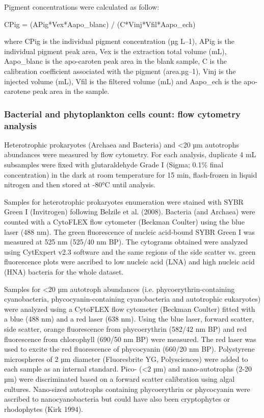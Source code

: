 \documentclass[essd, manuscript]{copernicus}
\begin{document}
Pigment concentrations were calculated as follow:


CPig = (APig*Vex*Aapo\_blanc) / (C*Vinj*Vfil*Aapo\_ech)
 
where CPig is the individual pigment concentration (µg L–1), APig is the individual pigment peak area, Vex is the extraction total volume (mL), Aapo\_blanc is the apo-caroten peak area in the blank sample, C is the calibration coefficient associated with the pigment (area.µg–1), Vinj is the injected volume (mL), Vfil is the filtered volume (mL) and Aapo\_ech is the apo-carotene peak area in the sample.


\subsubsection{Bacterial and phytoplankton cells count: flow cytometry analysis}
Heterotrophic prokaryotes (Archaea and Bacteria) and <20 µm autotrophs abundances were measured by flow cytometry. For each analysis, duplicate 4 mL subsamples were fixed with glutaraldehyde Grade I (Sigma; 0.1\% final concentration) in the dark at room temperature for 15 min, flash-frozen in liquid nitrogen and then stored at -80°C until analysis. 
 
Samples for heterotrophic prokaryotes enumeration were stained with SYBR Green I (Invitrogen) following Belzile et al. (2008). Bacteria (and Archaea) were counted with a CytoFLEX flow cytometer (Beckman Coulter) using the blue laser (488 nm). The green fluorescence of nucleic acid-bound SYBR Green I was measured at 525 nm (525/40 nm BP). The cytograms obtained were analyzed using CytExpert v2.3 software and the same regions of the side scatter vs. green fluorescence plots were ascribed to low nucleic acid (LNA) and high nucleic acid (HNA) bacteria for the whole dataset.
 
Samples for <20 µm autotroph abundances (i.e. phycoerythrin-containing cyanobacteria, phycocyanin-containing cyanobacteria and autotrophic eukaryotes) were analyzed using a CytoFLEX flow cytometer (Beckman Coulter) fitted with a blue (488 nm) and a red laser (638 nm). Using the blue laser, forward scatter, side scatter, orange fluorescence from phycoerythrin (582/42 nm BP) and red fluorescence from chlorophyll (690/50 nm BP) were measured. The red laser was used to excite the red fluorescence of phycocyanin (660/20 nm BP). Polystyrene microspheres of 2 µm diameter (Fluoresbrite YG, Polysciences) were added to each sample as an internal standard. Pico- (<2 µm) and nano-autotrophs (2-20 µm) were discriminated based on a forward scatter calibration using algal cultures. Nano-sized autotrophs containing phycoerythrin or phycocyanin were ascribed to nanocyanobacteria but could have also been cryptophytes or rhodophytes (Kirk 1994).
\end{document}
